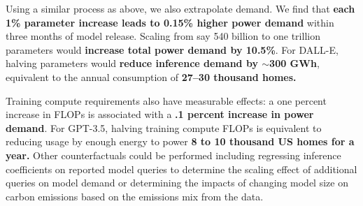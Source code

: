 \documentclass[sigconf,authordraft]{acmart}
\begin{document}
Using a similar process as above, we also extrapolate demand. We find that \textbf{each 1\% parameter increase leads to 0.15\% higher power demand} within three months of model release. Scaling from say 540 billion to one trillion parameters would \textbf{increase total power demand by 10.5\%}. For DALL-E, halving parameters would \textbf{reduce inference demand by $\sim$300 GWh}, equivalent to the annual consumption of \textbf{27--30 thousand homes.}

Training compute requirements also have measurable effects: a one percent increase in FLOPs is associated with a \textbf{.1 percent increase in power demand}. For GPT-3.5, halving training compute FLOPs is equivalent to reducing usage by enough energy to power \textbf{8 to 10 thousand US homes for a year.} Other counterfactuals could be performed including regressing inference coefficients on reported model queries to determine the scaling effect of additional queries on model demand or determining the impacts of changing model size on carbon emissions based on the emissions mix from the data.
\end{document}
